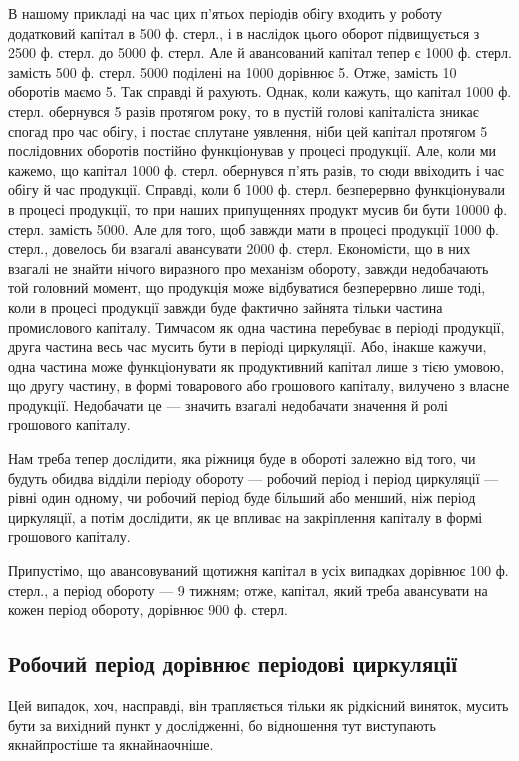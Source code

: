 В нашому прикладі на час цих п’ятьох періодів обігу входить у роботу
додатковий капітал в 500 ф. стерл., і в наслідок цього оборот підвищується
з 2500 ф. стерл. до 5000 ф. стерл. Але й авансований капітал
тепер є 1000 ф. стерл. замість 500 ф. стерл. 5000 поділені на 1000
дорівнює 5. Отже, замість 10 оборотів маємо 5. Так справді й рахують.
Однак, коли кажуть, що капітал 1000 ф. стерл. обернувся 5 разів протягом
року, то в пустій голові капіталіста зникає спогад про час обігу,
і постає сплутане уявлення, ніби цей капітал протягом 5 послідовних
оборотів постійно функціонував у процесі продукції. Але, коли ми кажемо,
що капітал 1000 ф. стерл. обернувся п’ять разів, то сюди ввіходить
і час обігу й час продукції. Справді, коли б 1000 ф. стерл. безперервно
функціонували в процесі продукції, то при наших припущеннях продукт
мусив би бути 10000 ф. стерл. замість 5000. Але для того, щоб завжди
мати в процесі продукції 1000 ф. стерл., довелось би взагалі авансувати
2000 ф. стерл. Економісти, що в них взагалі не знайти нічого виразного
про механізм обороту, завжди недобачають той головний момент, що
продукція може відбуватися безперервно лише тоді, коли в процесі продукції
завжди буде фактично зайнята тільки частина промислового капіталу.
Тимчасом як одна частина перебуває в періоді продукції, друга частина
весь час мусить бути в періоді циркуляції. Або, інакше кажучи, одна
частина може функціонувати як продуктивний капітал лише з тією умовою,
що другу частину, в формі товарового або грошового капіталу, вилучено
з власне продукції. Недобачати це — значить взагалі недобачати значення
й ролі грошового капіталу.

Нам треба тепер дослідити, яка ріжниця буде в обороті залежно від
того, чи будуть обидва відділи періоду обороту — робочий період і період
циркуляції — рівні один одному, чи робочий період буде більший
або менший, ніж період циркуляції, а потім дослідити, як це впливає на
закріплення капіталу в формі грошового капіталу.

Припустімо, що авансовуваний щотижня капітал в усіх випадках дорівнює
100 ф. стерл., а період обороту — 9 тижням; отже, капітал, який
треба авансувати на кожен період обороту, дорівнює 900 ф. стерл.

\subsection{Робочий період дорівнює періодові циркуляції}

Цей випадок, хоч, насправді, він трапляється тільки як рідкісний виняток,
мусить бути за вихідний пункт у дослідженні, бо відношення тут виступають
якнайпростіше та якнайнаочніше.


